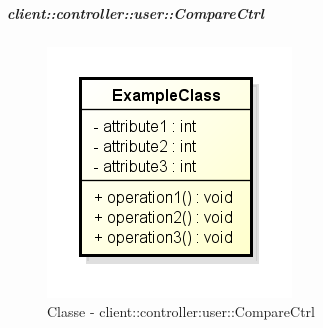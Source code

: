 		\subparagraph{client::controller::user::CompareCtrl} %
		\label{subp:client_controller_user_comparectrl}
			\begin{figure}[htbp]
				\centering
				\centerline{\includegraphics[scale=0.7]{./images/client/classes/example_class.png}}
				\caption{Classe - client::controller:user::CompareCtrl}
			\end{figure}
